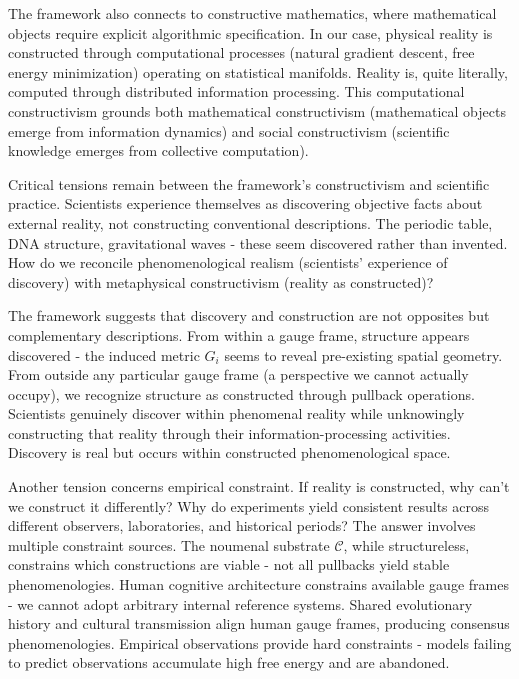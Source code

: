 \documentclass[11pt]{article}
\begin{document}
The framework also connects to constructive mathematics, where mathematical objects require explicit algorithmic specification. In our case, physical reality is constructed through computational processes (natural gradient descent, free energy minimization) operating on statistical manifolds. Reality is, quite literally, computed through distributed information processing. This computational constructivism grounds both mathematical constructivism (mathematical objects emerge from information dynamics) and social constructivism (scientific knowledge emerges from collective computation).

Critical tensions remain between the framework's constructivism and scientific practice. Scientists experience themselves as discovering objective facts about external reality, not constructing conventional descriptions. The periodic table, DNA structure, gravitational waves - these seem discovered rather than invented. How do we reconcile phenomenological realism (scientists' experience of discovery) with metaphysical constructivism (reality as constructed)?

The framework suggests that discovery and construction are not opposites but complementary descriptions. From within a gauge frame, structure appears discovered - the induced metric $G_i$ seems to reveal pre-existing spatial geometry. From outside any particular gauge frame (a perspective we cannot actually occupy), we recognize structure as constructed through pullback operations. Scientists genuinely discover within phenomenal reality while unknowingly constructing that reality through their information-processing activities. Discovery is real but occurs within constructed phenomenological space.

Another tension concerns empirical constraint. If reality is constructed, why can't we construct it differently? Why do experiments yield consistent results across different observers, laboratories, and historical periods? The answer involves multiple constraint sources. The noumenal substrate $\mathcal{C}$, while structureless, constrains which constructions are viable - not all pullbacks yield stable phenomenologies. Human cognitive architecture constrains available gauge frames - we cannot adopt arbitrary internal reference systems. Shared evolutionary history and cultural transmission align human gauge frames, producing consensus phenomenologies. Empirical observations provide hard constraints - models failing to predict observations accumulate high free energy and are abandoned.
\end{document}
